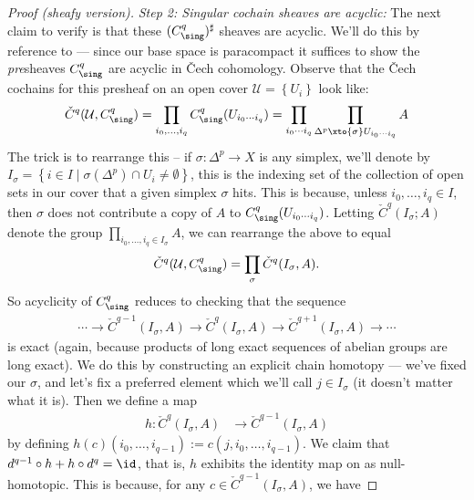 \documentclass[11pt]{amsart}
\begin{document}
\begin{proof}[Proof (sheafy version)]
\emph{Step 2: Singular cochain sheaves are acyclic:} The next claim to verify is that these $(C^q_\sing)^\sharp$ sheaves are acyclic. We'll do this by reference to  --- since our base space is paracompact it suffices to show the \emph{pre}sheaves $C^q_\sing$ are acyclic in \v{C}ech cohomology. Observe that the \v{C}ech cochains for this presheaf on an open cover $\mathcal{U} = \left\{ U_i \right\}$ look like:
\begin{align*}
    \check{C}^q (\mathcal{U}, C^q_\sing) = \prod_{i_0, \ldots, i_q} C^q_\sing(U_{i_0 \cdots i_q}) = \prod_{i_0 \cdots i_q} \prod_{\Delta^p \xto{\sigma} U_{i_0 \cdots i_q}}A
\end{align*}
The trick is to rearrange this -- if $\sigma \colon \Delta^p \to X$ is any simplex, we'll denote by $I_\sigma = \left\{ i\in I \mid \sigma(\Delta^p) \cap U_i \ne \emptyset \right\}$, this is the indexing set of the collection of open sets in our cover that a given simplex $\sigma$ hits. This is because, unless $i_0, \ldots, i_q\in I$, then $\sigma$ does not contribute a copy of $A$ to $C^q_\sing(U_{i_0 \cdots i_q})$. Letting $\check{C}^q(I_\sigma;A)$ denote the group $\prod_{i_0, \ldots, i_q \in I_\sigma} A$, we can rearrange the above to equal
\begin{align*}
    \check{C}^q(\mathcal{U},C^q_\sing) = \prod_{\sigma} \check{C}^q(I_\sigma,A).
\end{align*}
So acyclicity of $C^q_\sing$ reduces to checking that the sequence
\begin{equation}\label{eqn:Isigma-LES}
\begin{aligned}
    \cdots \to\check{C}^{q-1}(I_\sigma, A) \to \check{C}^q(I_\sigma,A) \to \check{C}^{q+1}(I_\sigma,A) \to \cdots
\end{aligned}
\end{equation}
is exact (again, because products of long exact sequences of abelian groups are long exact). We do this by constructing an explicit chain homotopy --- we've fixed our $\sigma$, and let's fix a preferred element which we'll call $j \in I_\sigma$ (it doesn't matter what it is). Then we define a map
\begin{align*}
    h \colon \check{C}^q (I_\sigma,A) &\to \check{C}^{q-1}(I_\sigma,A)
\end{align*}
by defining $h(c)(i_0, \ldots, i_{q-1}) := c(j,i_0, \ldots, i_{q-1})$. We claim that $d^{q-1}\circ h + h\circ d^{q} = \id$, that is, $h$ exhibits the identity map on  as null-homotopic. This is because, for any $c \in \check{C}^{q-1}(I_\sigma,A)$, we have

\end{proof}
\end{document}
